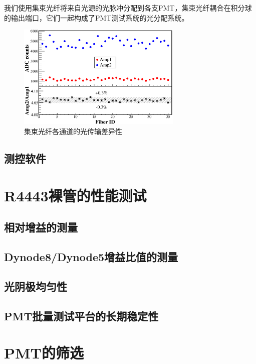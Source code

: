 我们使用集束光纤将来自光源的光脉冲分配到各支PMT，集束光纤耦合在积分球的输出端口，它们一起构成了PMT测试系统的光分配系统。
\begin{figure}[htbp]
	\centering
	\includegraphics[width=0.7\textwidth]{chap/pmt_test/fig/fiber_difference.eps}
	\caption{集束光纤各通道的光传输差异性}
	\label{fig:pmt_test:fiber_difference}
\end{figure}

\subsection{测控软件}


\section{R4443裸管的性能测试}
\label{sec:pmt_test:characterization}

\subsection{相对增益的测量}
\subsection{Dynode8/Dynode5增益比值的测量}
\subsection{光阴极均匀性}
\subsection{PMT批量测试平台的长期稳定性}

\section{PMT的筛选}

